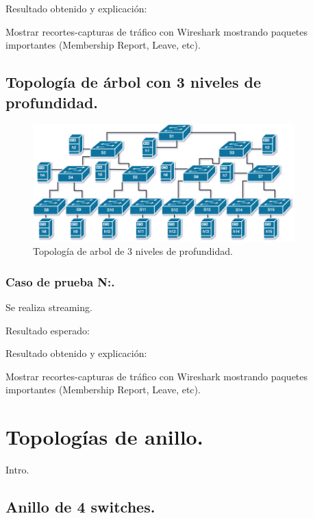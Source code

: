 \documentclass[12pt,a4paper,oneside]{book}
\begin{document}
\vspace{0.5cm}
Resultado obtenido y explicación: 

\vspace{0.5cm}
Mostrar recortes-capturas de tráfico con Wireshark mostrando paquetes importantes (Membership Report, Leave, etc).




\subsection{Topología de árbol con 3 niveles de profundidad.}

\begin{figure}[ht]
 \centering
 \includegraphics[width=0.9\textwidth]{fotos/5_Pruebas/2_topo_arbol/3niveles.png}
 \caption{Topología de arbol de 3 niveles de profundidad.}
 \label{topo_arbol_3_niveles}
\end{figure}

\subsubsection{Caso de prueba N:.} 
Se realiza streaming.

\vspace{0.5cm}
Resultado esperado: 

\vspace{0.5cm}
Resultado obtenido y explicación: 

\vspace{0.5cm}
Mostrar recortes-capturas de tráfico con Wireshark mostrando paquetes importantes (Membership Report, Leave, etc).

\section{Topologías de anillo.}

Intro.

\subsection{Anillo de 4 switches.}
\end{document}
